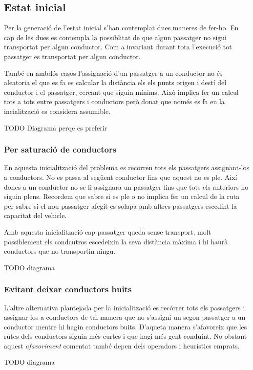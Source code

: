 \subsection{Estat inicial}
Per la generació de l'estat inicial s'han contemplat dues maneres de fer-ho. En cap de les dues es contempla
la possiblitat de que algun passatger no sigui transportat per algun conductor. Com a invariant durant
tota l'execució tot passatger es transportat per algun conductor.

També en ambdós casos l'assignació d'un passatger a un conductor no és aleatoria el que es fa es calcular
la distància els els punts origen i destí del conductor i el passatger, cercant que siguin mínims.
Això implica fer un calcul tots a tots entre passatgers i conductors però donat  que només es fa
en la incialització es considera assumible.

TODO Diagrama perqe es preferir

\subsubsection{Per saturació de conductors}
En aquesta inicialització del problema es recorren tots els passatgers assignant-los a conductors. No es passa
al següent conductor fins que aquest no es ple. Així doncs a un conductor no se li assignara un passatger
fins que tots els anteriors no siguin plens. Recordem que sabre si es ple o no implica fer un calcul de la ruta
per sabre si el nou passatger afegit es solapa amb altres passatgers escedint la capacitat del vehicle.

Amb aquesta inicialització cap passatger queda sense transport, molt possiblement els condcutros escedeixin
la seva distància màxima i hi haurà conductors que no transportin ningu.

TODO diagrama 

\subsubsection{Evitant deixar conductors buits}
L'altre alternativa plantejada per la inicialització es recórrer tots els passatgers i assignar-los a conductors
de tal manera que no s'assigni un segon passatger a un conductor mentre hi hagin conductors buits.
D'aqueta manera s'afavoreix que les rutes dels conductors siguin més curtes i que hagi més
gent conduint. No obstant aquest \emph{afavoriment} comentat també depen dels operadors i heurístics emprats.

TODO diagrama

